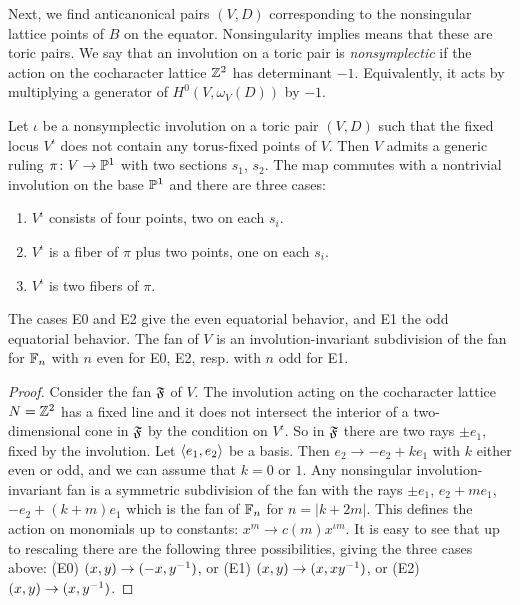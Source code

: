\documentclass{amsart}
\begin{document}
\smallskip

Next, we find anticanonical pairs $(V,D)$ corresponding to the
nonsingular lattice points of $B$ on the equator. Nonsingularity implies
means that these are toric pairs. We say that an involution on a toric
pair is {\it nonsymplectic} if the action on the cocharacter lattice ${\mathbb Z}^2$
has determinant $-1$. Equivalently, it acts by multiplying a generator
of $H^0(V, \omega_V(D))$ by $-1$. 

\begin{lemma}\label{lem:equatorial-toric}
  Let $\iota$ be a nonsymplectic involution on a toric pair $(V,D)$
  such that the fixed locus $V^\iota$ does not contain any torus-fixed
  points of $V$. Then $V$ admits a generic ruling
  $\pi\colon V\to{\mathbb P}^1$ with two sections $s_1$, $s_2$. The map
  commutes with a nontrivial involution on the base ${\mathbb P}^1$ and there
  are three cases:
  \begin{enumerate}
  \item[(E0)] $V^\iota$ consists of four points, two on each $s_i$. 
  \item[(E1)] $V^\iota$ is a fiber of $\pi$ plus two points, one on
    each $s_i$.
  \item[(E2)] $V^\iota$ is two fibers of $\pi$. 
  \end{enumerate}
  The cases E0 and E2 give the even equatorial behavior, and
  E1 the odd equatorial behavior.
  The fan of $V$ is an involution-invariant subdivision 
  of the fan for ${\mathbb F}_n$ with $n$ even for E0, E2, resp. with $n$ odd for E1.
\end{lemma}
\begin{proof}
  Consider the fan ${\mathfrak F}$ of $V$. The involution acting on the
  cocharacter lattice $N={\mathbb Z}^2$ has a fixed line and it does not
  intersect the interior of a two-dimensional cone in ${\mathfrak F}$ by the
  condition on $V^\iota$. So in ${\mathfrak F}$ there are two rays $\pm e_1$,
  fixed by the involution. Let $\langle e_1,e_2\rangle$ be a basis.
  Then $e_2\to -e_2 + ke_1$ with $k$ either even or odd, and we can
  assume that $k=0$ or $1$.
  Any nonsingular involution-invariant fan is a
  symmetric subdivision of the fan with the rays $\pm e_1$,
  $e_2 + me_1$, $-e_2+(k+m)e_1$ which is the fan of ${\mathbb F}_n$ for
  $n=|k+2m|$. 
  This defines the action on monomials up to constants: $x^m\to c(m)
  x^{\iota m}$. It is easy to see that up to rescaling there are the
  following three possibilities, giving the three cases above:
  \noindent
  (E0) $(x,y)\to (-x,y^{-1})$, or 
  (E1) $(x,y)\to (x, xy^{-1})$, or
  (E2) $(x,y)\to (x,y^{-1})$.
\end{proof}
\end{document}
